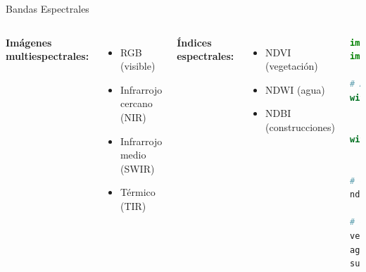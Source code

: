 \documentclass[10pt,aspectratio=169]{beamer}
\begin{document}
\begin{frame}[fragile]{Bandas Espectrales}
    \begin{columns}[T]
        \textbf{Imágenes multiespectrales:}
        \begin{itemize}
            \item RGB (visible)
            \item Infrarrojo cercano (NIR)
            \item Infrarrojo medio (SWIR)
            \item Térmico (TIR)
        \end{itemize}
        
        \textbf{Índices espectrales:}
        \begin{itemize}
            \item NDVI (vegetación)
            \item NDWI (agua)
            \item NDBI (construcciones)
        \end{itemize}
        
        \begin{lstlisting}[language=Python]
import rasterio
import numpy as np

# Abrir bandas
with rasterio.open('B4_red.tif') as red:
    b4 = red.read(1).astype(float)
    
with rasterio.open('B5_nir.tif') as nir:
    b5 = nir.read(1).astype(float)

# Calcular NDVI
ndvi = (b5 - b4) / (b5 + b4 + 1e-10)

# Clasificar vegetacion
vegetacion = ndvi > 0.3
agua = ndvi < 0
suelo = (ndvi >= 0) & (ndvi <= 0.3)
        \end{lstlisting}
    \end{columns}
\end{frame}
\end{document}
